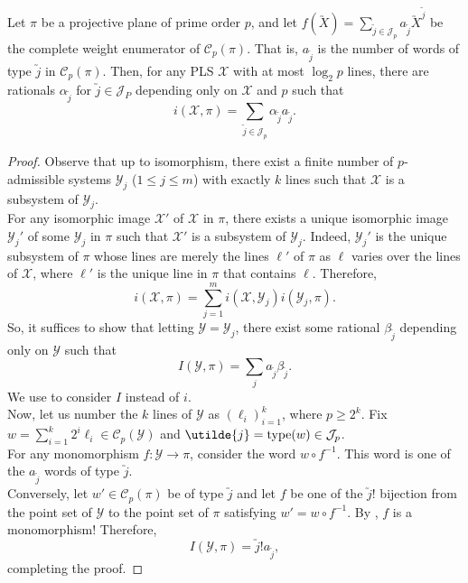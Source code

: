	\begin{ftheo}
		\label{theo: linear combination of cwe coeffs}
		Let $\pi$ be a projective plane of prime order $p$, and let $f(\utilde{X}) = \sum_{\utilde{j} \in \mathcal{J}_p} a_{\utilde{j}} \utilde{X}^{\utilde{j}}$ be the complete weight enumerator of $\mathcal{C}_p(\pi)$. That is, $a_{\utilde{j}}$ is the number of words of type $\utilde{j}$ in $\mathcal{C}_p(\pi)$. Then, for any PLS $\mathcal{X}$ with at most $\log_2 p$ lines, there are rationals $\alpha_{\utilde{j}}$ for $\utilde{j} \in \mathcal{J}_P$ depending only on $\mathcal{X}$ and $p$ such that
		\[ i(\mathcal{X},\pi) = \sum_{\utilde{j} \in \mathcal{J}_p} \alpha_{\utilde{j}} a_{\utilde{j}}. \]
	\end{ftheo}
	\begin{proof}
		Observe that up to isomorphism, there exist a finite number of $p$-admissible systems $\mathcal{Y}_j$ ($1 \le j \le m$) with exactly $k$ lines such that $\mathcal{X}$ is a subsystem of $\mathcal{Y}_j$.\\
		For any isomorphic image $\mathcal{X}'$ of $\mathcal{X}$ in $\pi$, there exists a unique isomorphic image $\mathcal{Y}_j'$ of some $\mathcal{Y}_j$ in $\pi$ such that $\mathcal{X}'$ is a subsystem of $\mathcal{Y}_j$. Indeed, $\mathcal{Y}_j'$ is the unique subsystem of $\pi$ whose lines are merely the lines $\ell'$ of $\pi$ as $\ell$ varies over the lines of $\mathcal{X}$, where $\ell'$ is the unique line in $\pi$ that contains $\ell$. Therefore,
		\[ i(\mathcal{X},\mathcal{\pi}) = \sum_{j=1}^m i(\mathcal{X},\mathcal{Y}_j) i(\mathcal{Y}_j,\pi). \]
		So, it suffices to show that letting $\mathcal{Y} = \mathcal{Y}_j$, there exist some rational $\beta_{\utilde{j}}$ depending only on $\mathcal{Y}$ such that
		\[ I(\mathcal{Y},\pi) = \sum_j a_{\utilde{j}} \beta_{\utilde{j}}. \]
		We use  to consider $I$ instead of $i$.\\
		Now, let us number the $k$ lines of $\mathcal{Y}$ as $(\ell_i)_{i=1}^k$, where $p \ge 2^k$. Fix $w = \sum_{i=1}^k 2^i \ell_i \in \mathcal{C}_p(\mathcal{Y})$ and $\utilde{j} = \type(w) \in \mathcal{J}_p$.\\
		For any monomorphism $f : \mathcal{Y} \to \pi$, consider the word $w \circ f^{-1}$. This word is one of the $a_{\utilde{j}}$ words of type $\utilde{j}$.\\
		Conversely, let $w' \in \mathcal{C}_p(\pi)$ be of type $\utilde{j}$ and let $f$ be one of the $\utilde{j}!$ bijection from the point set of $\mathcal{Y}$ to the point set of $\pi$ satisfying $w' = w \circ f^{-1}$. By , $f$ is a monomorphism! Therefore,
		\[ I(\mathcal{Y},\pi) = \utilde{j}! a_{\utilde{j}}, \]
		completing the proof.
	\end{proof}

